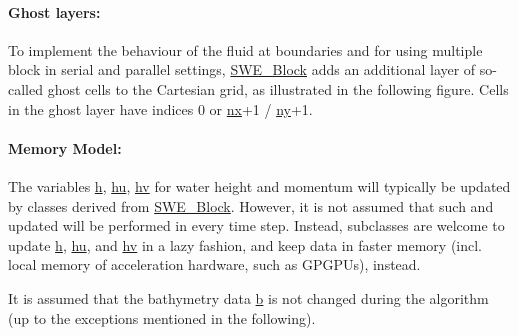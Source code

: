 \paragraph*{Ghost layers\+:}

To implement the behaviour of the fluid at boundaries and for using multiple block in serial and parallel settings, \hyperlink{classSWE__Block}{S\+W\+E\+\_\+\+Block} adds an additional layer of so-\/called ghost cells to the Cartesian grid, as illustrated in the following figure. Cells in the ghost layer have indices 0 or \hyperlink{classSWE__Block_a46ec0dc1157997bd255fb39924f1e2bb}{nx}+1 / \hyperlink{classSWE__Block_a3f139630d12423eb4bd7df3e45c7f5da}{ny}+1.



\paragraph*{Memory Model\+:}

The variables \hyperlink{classSWE__Block_a64a0f8f437f38b5f3b8ec5b4abdb864e}{h}, \hyperlink{classSWE__Block_aec2c1278fdb23f083216d8d397f26060}{hu}, \hyperlink{classSWE__Block_a0897aa3c2d78749f209c95e08196d831}{hv} for water height and momentum will typically be updated by classes derived from \hyperlink{classSWE__Block}{S\+W\+E\+\_\+\+Block}. However, it is not assumed that such and updated will be performed in every time step. Instead, subclasses are welcome to update \hyperlink{classSWE__Block_a64a0f8f437f38b5f3b8ec5b4abdb864e}{h}, \hyperlink{classSWE__Block_aec2c1278fdb23f083216d8d397f26060}{hu}, and \hyperlink{classSWE__Block_a0897aa3c2d78749f209c95e08196d831}{hv} in a lazy fashion, and keep data in faster memory (incl. local memory of acceleration hardware, such as G\+P\+G\+P\+Us), instead.

It is assumed that the bathymetry data \hyperlink{classSWE__Block_af7487209129f40b26ea171762754a261}{b} is not changed during the algorithm (up to the exceptions mentioned in the following).

